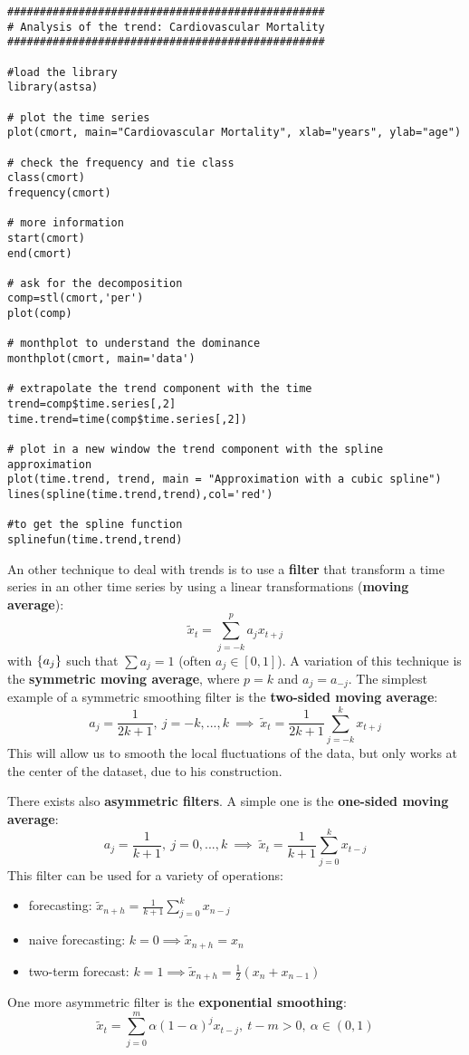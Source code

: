 \begin{example}
    \begin{verbatim}
#################################################
# Analysis of the trend: Cardiovascular Mortality
#################################################

#load the library 
library(astsa)

# plot the time series
plot(cmort, main="Cardiovascular Mortality", xlab="years", ylab="age")

# check the frequency and tie class 
class(cmort) 
frequency(cmort)

# more information 
start(cmort)
end(cmort)

# ask for the decomposition 
comp=stl(cmort,'per')
plot(comp)

# monthplot to understand the dominance 
monthplot(cmort, main='data')

# extrapolate the trend component with the time 
trend=comp$time.series[,2]
time.trend=time(comp$time.series[,2])

# plot in a new window the trend component with the spline approximation 
plot(time.trend, trend, main = "Approximation with a cubic spline") 
lines(spline(time.trend,trend),col='red')

#to get the spline function 
splinefun(time.trend,trend)
    \end{verbatim}
\end{example}

An other technique to deal with trends is to use a \textbf{filter} that transform a time series in an other time series by using a linear transformations (\textbf{moving average}):
\[
    \tilde{x}_t=\sum_{j=-k}^pa_jx_{t+j}  
\]
with $\left\{a_j\right\}$ such that $\sum a_j=1$ (often $a_j\in[0,1]$). A variation of this technique is the \textbf{symmetric moving average}, where $p=k$ and $a_j=a_{-j}$. The simplest example of a symmetric smoothing filter is the \textbf{two-sided moving average}:
\[
    a_j=\frac{1}{2k+1},\ j=-k,...,k\ \implies\ \tilde{x}_t=\frac{1}{2k+1}\sum_{j=-k}^k x_{t+j}  
\]
This will allow us to smooth the local fluctuations of the data, but only works at the center of the dataset, due to his construction.

There exists also \textbf{asymmetric filters}. A simple one is the \textbf{one-sided moving average}:
\[
    a_j=\frac{1}{k+1},\ j=0,...,k\ \implies\ \tilde{x}_t=\frac{1}{k+1}\sum_{j=0}^kx_{t-j}  
\]
This filter can be used for a variety of operations:
\begin{itemize}
    \item forecasting: $\tilde{x}_{n+h}=\frac{1}{k+1}\sum_{j=0}^kx_{n-j}$
    \item naive forecasting: $k=0\implies\tilde{x}_{n+h}=x_n$
    \item two-term forecast: $k=1\implies\tilde{x}_{n+h}=\frac{1}{2}(x_n+x_{n-1})$
\end{itemize}
One more asymmetric filter is the \textbf{exponential smoothing}:
\[
    \tilde{x}_t=\sum_{j=0}^m\alpha(1-\alpha)^jx_{t-j},\ t-m>0,\ \alpha\in(0,1)  
\]

